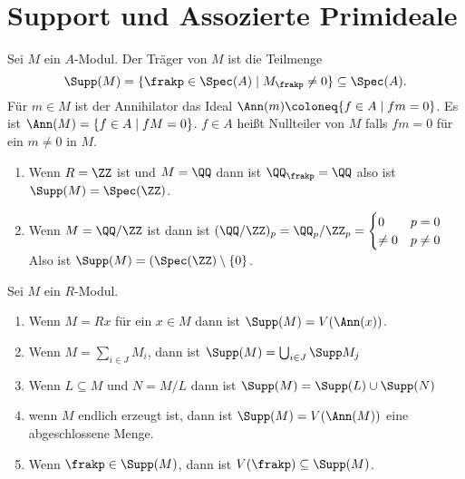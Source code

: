 \section{Support und Assozierte Primideale}
\begin{Def} Sei \( M \) ein \( A \)-Modul. Der Träger von \( M \) ist die Teilmenge 
	\[ \Supp(M)=\{ \frakp\in\Spec(A)\mid M_\frakp \neq 0 \} \subseteq \Spec(A). \]
	Für \( m\in M \) ist der Annihilator das Ideal \( \Ann(m)\coloneq \{ f\in A \mid fm=0\}\).
	Es ist \( \Ann(M)=\{ f\in A \mid fM=0\}\). \(f\in A \) heißt Nullteiler von \( M \) falls \(fm=0\) für ein \(m\neq 0\) in \(M\).
\end{Def}
\begin{Bsp}
	\begin{enumerate}
		\item Wenn \(R=\ZZ\) ist und \(M=\QQ\) dann ist \(\QQ_\frakp=\QQ\) also ist \(\Supp(M)=\Spec(\ZZ)\).
		\item Wenn \(M=\QQ/\ZZ\) ist dann ist \((\QQ/\ZZ)_p=\QQ_p/\ZZ_p=\begin{cases}
			0 & p=0\\
			\neq 0 & p\neq 0
		\end{cases}\) Also ist \(\Supp(M)=(\Spec(\ZZ)\setminus\{0\}\).
	\end{enumerate}
\end{Bsp}
\begin{Satz} Sei \( M \) ein \( R\)-Modul.
	\begin{enumerate}
		\item Wenn \( M=Rx \) für ein \(x\in M\) dann ist \(\Supp(M)=V(\Ann(x))\).
		\item Wenn \(M=\sum_{i\in J} M_i\), dann ist \( \Supp(M)=\bigcup_{i\in J}\Supp M_j \)
		\item Wenn \(L\subseteq M\) und \(N=M/L\) dann ist \(\Supp(M)=\Supp(L)\cup \Supp(N)\)
		\item wenn \(M \) endlich erzeugt ist, dann ist \(\Supp(M)=V(\Ann(M))\) eine abgeschlossene Menge.
		\item Wenn \(\frakp\in\Supp(M)\), dann ist \(V(\frakp)\subseteq\Supp(M)\).
	\end{enumerate}
	
\end{Satz}
